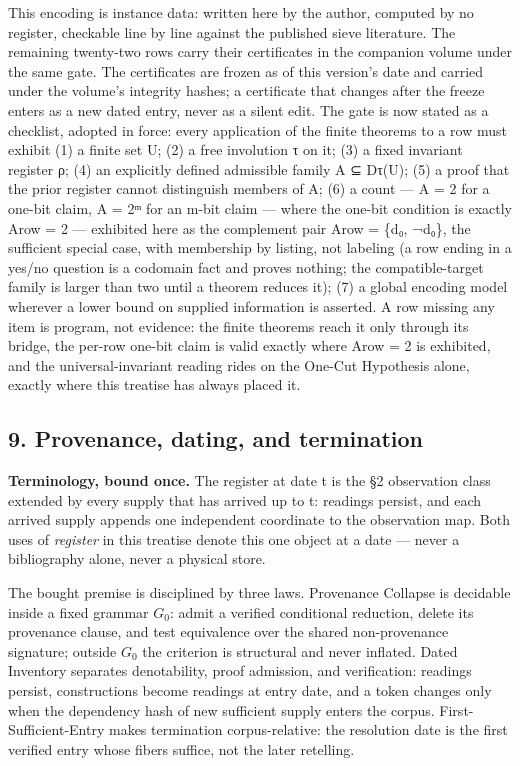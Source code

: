 \documentclass[10pt]{article}
\renewcommand{\_}{\origunderscore\allowbreak}
\begin{document}
This encoding is instance data: written here by the author, computed by
no register, checkable line by line against the published sieve
literature. The remaining twenty-two rows carry their certificates in
the companion volume under the same gate. The certificates are frozen as
of this version's date and carried under the volume's integrity hashes;
a certificate that changes after the freeze enters as a new dated entry,
never as a silent edit. The gate is now stated as a checklist, adopted
in force: every application of the finite theorems to a row must exhibit
(1) a finite set U; (2) a free involution τ on it; (3) a fixed invariant
register ρ; (4) an explicitly defined admissible family A ⊆ Dτ(U); (5) a
proof that the prior register cannot distinguish members of A; (6) a
count --- \textbar A\textbar{} = 2 for a one-bit claim,
\textbar A\textbar{} = 2ᵐ for an m-bit claim --- where the one-bit
condition is exactly \textbar A\_row\textbar{} = 2 --- exhibited here as
the complement pair A\_row = \{d₀, ¬d₀\}, the sufficient special case,
with membership by listing, not labeling (a row ending in a yes/no
question is a codomain fact and proves nothing; the compatible-target
family is larger than two until a theorem reduces it); (7) a global
encoding model wherever a lower bound on supplied information is
asserted. A row missing any item is program, not evidence: the finite
theorems reach it only through its bridge, the per-row one-bit claim is
valid exactly where \textbar A\_row\textbar{} = 2 is exhibited, and the
universal-invariant reading rides on the One-Cut Hypothesis alone,
exactly where this treatise has always placed it.

\hypertarget{provenance-dating-and-termination}{%
\subsection{9. Provenance, dating, and
termination}\label{provenance-dating-and-termination}}

\textbf{Terminology, bound once.} The register at date t is the §2
observation class extended by every supply that has arrived up to t:
readings persist, and each arrived supply appends one independent
coordinate to the observation map. Both uses of \emph{register} in this
treatise denote this one object at a date --- never a bibliography
alone, never a physical store.

The bought premise is disciplined by three laws. Provenance Collapse is
decidable inside a fixed grammar \(G_0\): admit a verified conditional
reduction, delete its provenance clause, and test equivalence over the
shared non-provenance signature; outside \(G_0\) the criterion is
structural and never inflated. Dated Inventory separates denotability,
proof admission, and verification: readings persist, constructions
become readings at entry date, and a token changes only when the
dependency hash of new sufficient supply enters the corpus.
First-Sufficient-Entry makes termination corpus-relative: the resolution
date is the first verified entry whose fibers suffice, not the later
retelling.
\end{document}
